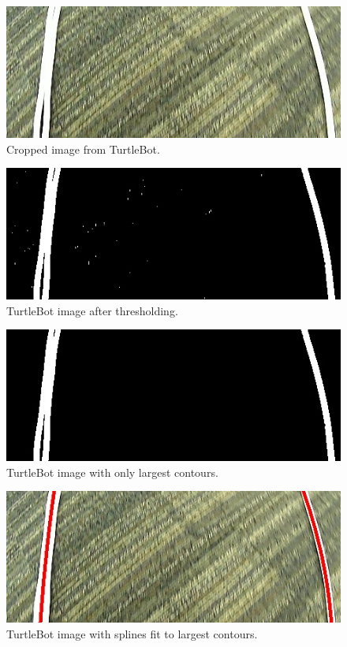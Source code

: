 \begin{figure}
  \centering
  \includegraphics[scale=0.67]{figures/classical_crop.jpg}
  \caption{Cropped image from TurtleBot.}
  \label{fig:classical_crop}
\end{figure}

\begin{figure}
  \centering
  \includegraphics[scale=0.5]{figures/classical_thresh.jpg}
  \caption{TurtleBot image after thresholding.}
  \label{fig:classical_thresh}
\end{figure}

\begin{figure}
  \centering
  \includegraphics[scale=0.5]{figures/classical_contours.jpg}
  \caption{TurtleBot image with only largest contours.}
  \label{fig:classical_contours}
\end{figure}

\begin{figure}
  \centering
  \includegraphics[scale=0.5]{figures/classical_fit.jpg}
  \caption{TurtleBot image with splines fit to largest contours.}
  \label{fig:classical_fit}
\end{figure}

